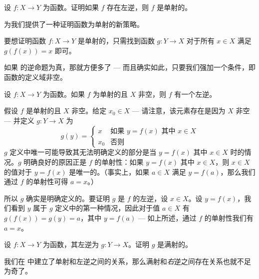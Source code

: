 \begin{exercise}
\label{exIfHasLeftInverseThenInjective}
设 $f : X \to Y$ 为函数。证明如果 $f$ 存在左逆，则 $f$ 是单射的。
\end{exercise}

 为我们提供了一种证明函数为单射的新策略。

\begin{strategy}[通过左逆证明函数为单射]
要想证明函数 $f : X \to Y$ 是单射的，只需找到函数 $g : Y \to X$ 对于所有 $x \in X$ 满足 $g(f(x)) = x$ 即可。
\end{strategy}

如果  的逆命题为真，那就方便多了 --- 而且确实如此，只要我们强加一个条件，即函数的定义域非空。

\begin{proposition}
\label{propIfInjectiveThenHasLeftInverse}
设 $f : X \to Y$ 为函数。如果 $f$ 为单射的且 $X$ 非空，则 $f$ 有一个左逆。
\end{proposition}

\begin{cproof}
假设 $f$ 是单射的且 $X$ 非空。给定 $x_0 \in X$ --- 请注意，该元素存在是因为 $X$ 非空 --- 并定义 $g : Y \to X$ 为
\[ g(y) = \begin{cases} x & \text{如果 } y=f(x) \text{ 其中 } x \in X \\ x_0 & \text{否则} \end{cases} \]
$g$ 定义中唯一可能导致其无法明确定义的部分是当 $y=f(x)$ 其中 $x \in X$ 时的情况。$g$ 明确良好的原因正是 $f$ 的单射性：如果 $y=f(x)$ 其中 $x \in X$，则 $x \in X$ 的值对于 $y = f(x)$ 是唯一的。（事实上，如果 $a \in X$ 满足 $y=f(a)$，那么我们通过 $f$ 的单射性可得 $a=x$。）

所以 $g$ 确实是明确定义的。要证明 $g$ 是 $f$ 的左逆，设 $x \in X$。设 $y = f(x)$，我们看到 $y$ 属于 $g$ 定义中的第一种情况，因此对于值 $a \in X$ 有 $g(f(x)) = g(y) = a$，其中 $y = f(a)$ --- 如上所述，通过 $f$ 的单射性我们有 $a=x$。
\end{cproof}

\begin{exercise}
设 $f : X \to Y$ 为函数，其左逆为 $g : Y \to X$。证明 $g$ 是满射的。
\end{exercise}

我们在  中建立了单射和左逆之间的关系，那么满射和\textit{右}逆之间存在关系也就不足为奇了。

